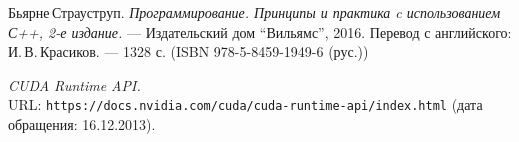 \begin{thebibliography}{99}
Бьярне\,Страуструп.
{\itshape Программирование. Принципы и практика c использованием С++, 2-е издание.} --- Издательский дом \enquote{Вильямс}, 2016. Перевод с английского: И.\,В.\,Красиков. --- 1328 с. (ISBN 978-5-8459-1949-6 (рус.))

{\itshape CUDA Runtime API.} \\URL: \texttt{https://docs.nvidia.com/cuda/cuda-runtime-api/index.html} (дата обращения: 16.12.2013).

\end{thebibliography}
